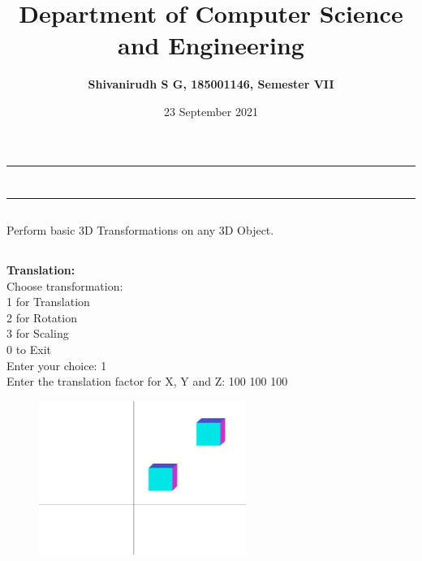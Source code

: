 \documentclass[9pt,letterpaper]{article}
\title{\textbf{Department of Computer Science and Engineering}}
\author{\textbf{Shivanirudh S G, 185001146, Semester VII }}
\date{23 September 2021}
\begin{document}
\maketitle
\hrule
\section*{}
\hrule 
\bigskip\bigskip

\subsection*{}

\subsection*{}
\begin{flushleft}
    Perform basic 3D Transformations on any 3D Object.
\end{flushleft}

\subsection*{}
\begin{flushleft}




\end{flushleft}
\newpage
\subsection*{}
\textbf{Translation:}\\

Choose transformation: \\
1 for Translation      \\
2 for Rotation         \\
3 for Scaling          \\
0 to Exit              \\
Enter your choice: 1   \\
Enter the translation factor for X, Y and Z: 100 100 100  \\

\begin{figure}[h]
    \centering
    \includegraphics[height=5cm]{Outputs/OP1.png}
\end{figure}
\end{document}
